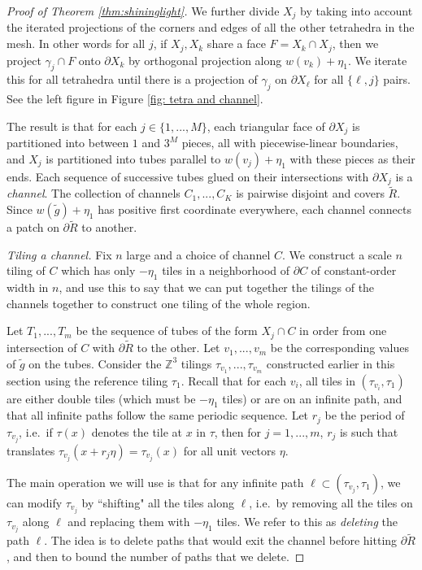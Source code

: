 \documentclass[11pt]{article}
\theoremstyle{remark}
\theoremstyle{definition}
\newcommand{\termindex}[1]{\index{{\textbf{Terms}}!#1}}
\begin{document}
\begin{proof}[Proof of Theorem \ref{thm:shininglight}]
We further divide $X_j$ by taking into account the iterated projections of the corners and edges of all the other tetrahedra in the mesh. In other words for all $j$, if $X_j,X_k$ share a face $F=X_k\cap X_j$, then we project $\gamma_j\cap F$ onto $\partial X_k$ by orthogonal projection along $w(v_k)+\eta_1$.  We iterate this for all tetrahedra until there is a projection of $\gamma_j$ on $\partial X_\ell$ for all $\{\ell,j\}$ pairs. See the left figure in Figure \ref{fig: tetra and channel}.

The result is that for each $j\in \{1,...,M\}$, each triangular face of $\partial X_j$ is partitioned into between $1$ and $3^M$ pieces, all with piecewise-linear boundaries, and $X_j$ is partitioned into tubes parallel to $w(v_j)+ \eta_1$ with these pieces as their ends. Each sequence of successive tubes glued on their intersections with $\partial X_j$ is a \textit{channel}\termindex{Chapter 8!channel}. The collection of channels $C_1,...,C_K$ is pairwise disjoint and covers $\widetilde R$. Since $w(\widetilde g)+\eta_1$ has positive first coordinate everywhere, each channel connects a patch on $\partial \widetilde R$ to another. 

\textit{Tiling a channel.} Fix $n$ large and a choice of channel $C$. We construct a scale $n$ tiling of $C$ which has only $-\eta_1$ tiles in a neighborhood of $\partial C$ of constant-order width in $n$, and use this to say that we can put together the tilings of the channels together to construct one tiling of the whole region. 

Let $T_1,...,T_m$ be the sequence of tubes of the form $X_j\cap C$ in order from one intersection of $C$ with $\partial \widetilde R$ to the other. Let $v_1,...,v_m$ be the corresponding values of $\widetilde g$ on the tubes.  Consider the $\mathbb{Z}^3$ tilings $\tau_{v_1},...,\tau_{v_m}$ constructed earlier in this section using the reference tiling $\tau_1$. Recall that for each $v_i$, all tiles in $(\tau_{v_i},\tau_1)$ are either double tiles (which must be $-\eta_1$ tiles) or are on an infinite path, and that all infinite paths follow the same periodic sequence. Let $r_j$ be the period of $\tau_{v_j}$, i.e.\ if $\tau(x)$ denotes the tile at $x$ in $\tau$, then for $j=1,...,m$, $r_j$ is such that translates $\tau_{v_j}(x+r_j \eta) = \tau_{v_j}(x)$ for all unit vectors $\eta$.

The main operation we will use is that for any infinite path $\ell\subset (\tau_{v_j},\tau_1)$, we can modify $\tau_{v_j}$ by ``shifting" all the tiles along $\ell$, i.e.\ by removing all the tiles on $\tau_{v_j}$ along $\ell$ and replacing them with $-\eta_1$ tiles. We refer to this as \textit{deleting} the path $\ell$. The idea is to delete paths that would exit the channel before hitting $\partial \widetilde R$, and then to bound the number of paths that we delete.


\end{proof}
\end{document}
